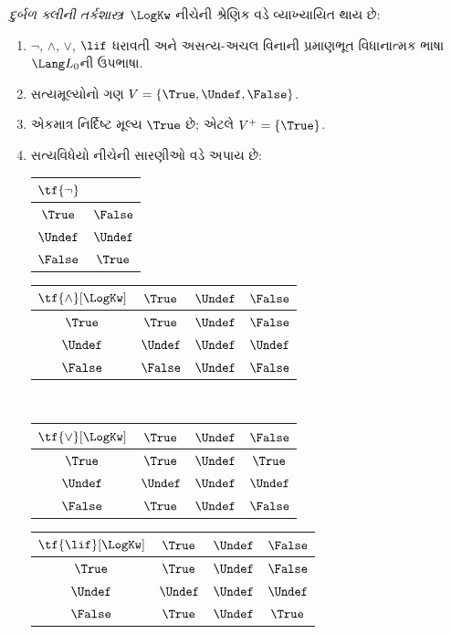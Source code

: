 \documentclass[../../../include/open-logic-section]{subfiles}
\begin{document}
\begin{defn}
\emph{દુર્બળ ક્લીની તર્કશાસ્ત્ર}~$\LogKw$ નીચેની શ્રેણિક વડે વ્યાખ્યાયિત થાય છે:
\begin{enumerate}
  \item $\lnot$, $\land$, $\lor$, $\lif$ ધરાવતી અને
  અસત્ય-અચલ વિનાની પ્રમાણભૂત વિધાનાત્મક ભાષા~$\Lang L_0$ની ઉપભાષા.
  \item સત્યમૂલ્યોનો ગણ $V = \{\True, \Undef, \False\}$.
  \item એકમાત્ર નિર્દિષ્ટ મૂલ્ય $\True$ છે; એટલે $V^+ = \{\True\}$.
  \item સત્યવિધેયો નીચેની સારણીઓ વડે અપાય છે:
  \begin{center}
    \begin{tabular}{c|c}
      $\tf{\lnot}$ & \\
      \hline
      $\True$ & $\False$ \\
      $\Undef$ & $\Undef$ \\
      $\False$ & $\True$
    \end{tabular}
    \quad
    \begin{tabular}{c|ccc}
      $\tf{\land}[\LogKw]$ & $\True$ & $\Undef$ & $\False$ \\
      \hline
      $\True$ & $\True$ & $\Undef$ & $\False$ \\
      $\Undef$ & $\Undef$ & $\Undef$ & $\Undef$\\
      $\False$ & $\False$ & $\Undef$ & $\False$
    \end{tabular}
    \\[2ex]
    \begin{tabular}{c|ccc}
      $\tf{\lor}[\LogKw]$ & $\True$ & $\Undef$ & $\False$ \\
      \hline
      $\True$ & $\True$ & $\Undef$ & $\True$ \\
      $\Undef$ & $\Undef$ & $\Undef$ & $\Undef$ \\
      $\False$ & $\True$ & $\Undef$ & $\False$
    \end{tabular}
    \quad
    \begin{tabular}{c|ccc}
      $\tf{\lif}[\LogKw]$ & $\True$ & $\Undef$ & $\False$ \\
      \hline
      $\True$ & $\True$ & $\Undef$ & $\False$ \\
      $\Undef$ & $\Undef$ & $\Undef$ & $\Undef$ \\
      $\False$ & $\True$ & $\Undef$ & $\True$
    \end{tabular}
  \end{center}
\end{enumerate}
\end{defn}
\end{document}
